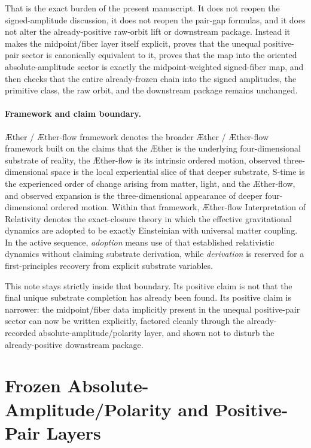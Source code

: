 \documentclass[11pt]{article}
\newcommand{\Aether}{\AE{}ther}
\newcommand{\Aflow}{\AE{}ther-flow}
\newcommand{\TheoryName}{\Aflow{} Interpretation of Relativity}
\newcommand{\TheoryProgram}{\Aether{} / \Aflow{} framework}
\begin{document}
That is the exact burden of the present manuscript. It does not reopen the signed-amplitude discussion, it does not reopen the pair-gap formulas, and it does not alter the already-positive raw-orbit lift or downstream package. Instead it makes the midpoint/fiber layer itself explicit, proves that the unequal positive-pair sector is canonically equivalent to it, proves that the map into the oriented absolute-amplitude sector is exactly the midpoint-weighted signed-fiber map, and then checks that the entire already-frozen chain into the signed amplitudes, the primitive class, the raw orbit, and the downstream package remains unchanged.

\paragraph{Framework and claim boundary.}
\TheoryProgram{} denotes the broader \Aether{} / \Aflow{} framework built on the claims that the \Aether{} is the underlying four-dimensional substrate of reality, the \Aflow{} is its intrinsic ordered motion, observed three-dimensional space is the local experiential slice of that deeper substrate, S-time is the experienced order of change arising from matter, light, and the \Aflow{}, and observed expansion is the three-dimensional appearance of deeper four-dimensional ordered motion. Within that framework, \TheoryName{} denotes the exact-closure theory in which the effective gravitational dynamics are adopted to be exactly Einsteinian with universal matter coupling. In the active sequence, \emph{adoption} means use of that established relativistic dynamics without claiming substrate derivation, while \emph{derivation} is reserved for a first-principles recovery from explicit substrate variables.

This note stays strictly inside that boundary. Its positive claim is not that the final unique substrate completion has already been found. Its positive claim is narrower: the midpoint/fiber data implicitly present in the unequal positive-pair sector can now be written explicitly, factored cleanly through the already-recorded absolute-amplitude/polarity layer, and shown not to disturb the already-positive downstream package.

\section{Frozen Absolute-Amplitude/Polarity and Positive-Pair Layers}
\end{document}

